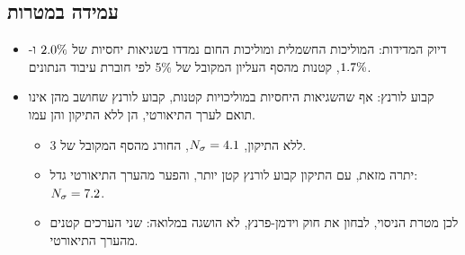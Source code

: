 \documentclass[10pt,a4paper]{article}
\begin{document}
\subsection*{עמידה במטרות}
\begin{itemize}\setlength{\itemsep}{2pt}\setlength{\parskip}{0pt}
  \item דיוק המדידות: המוליכות החשמלית ומוליכות החום נמדדו בשגיאות יחסיות של $2.0\%$ ו-$1.7\%$, קטנות מהסף העליון המקובל של 5\% לפי חוברת עיבוד הנתונים.
  \item קבוע לורנץ: אף שהשגיאות היחסיות במוליכויות קטנות, קבוע לורנץ שחושב מהן אינו תואם לערך התיאורטי, הן ללא התיקון והן עמו.
  \begin{itemize}\setlength{\itemsep}{0pt}\setlength{\parskip}{0pt}
    \item ללא התיקון, $N_\sigma = 4.1$, החורג מהסף המקובל של 3.
    \item יתרה מזאת, עם התיקון קבוע לורנץ קטן יותר, והפער מהערך התיאורטי גדל: $N_\sigma = 7.2$.
    \item לכן מטרת הניסוי, לבחון את חוק וידמן-פרנץ, לא הושגה במלואה: שני הערכים קטנים מהערך התיאורטי.
  \end{itemize}
\end{itemize}
\end{document}
